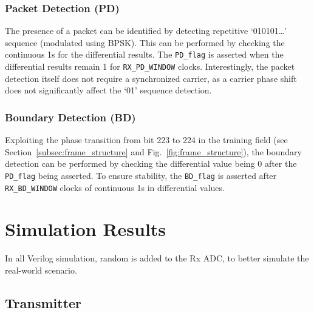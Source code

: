 \documentclass[journal,twoside]{IEEEtran}
\begin{document}
      \subsubsection{Packet Detection (PD)}
      The presence of a packet can be identified by detecting repetitive `010101\dots' sequence (modulated using BPSK).
      This can be performed by checking the continuous 1s for the differential results.
      The \texttt{PD\_flag} is asserted when the differential results remain 1 for \texttt{RX\_PD\_WINDOW} clocks.
      Interestingly, the packet detection itself does not require a synchronized carrier,
      as a carrier phase shift does not significantly affect the `01' sequence detection.

      \subsubsection{Boundary Detection (BD)}
      Exploiting the phase transition from bit 223 to 224 in the training field
      (see Section~\ref{subsec:frame_structure} and Fig.~\ref{fig:frame_structure}),
      the boundary detection can be performed by checking the differential value being 0
      after the \texttt{PD\_flag} being asserted.
      To ensure stability,
      the \texttt{BD\_flag} is asserted after \texttt{RX\_BD\_WINDOW} clocks of continuous 1s in differential values.

  \section{Simulation Results}

    In all Verilog simulation,
    random is added to the Rx ADC, to better simulate the real-world scenario.

    \subsection{Transmitter}
\end{document}
